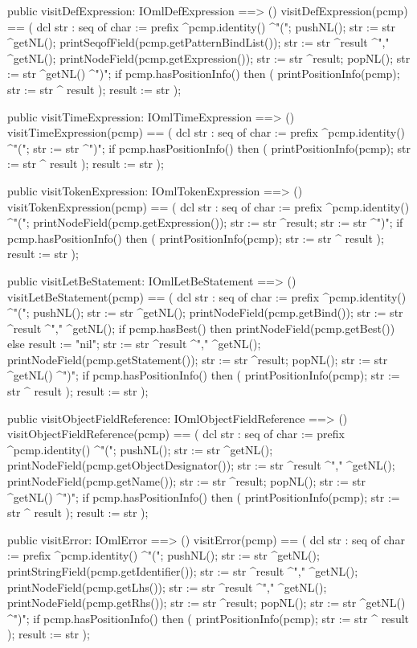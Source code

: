 \begin{vdm_al}
  public visitDefExpression: IOmlDefExpression ==> ()
  visitDefExpression(pcmp) ==
    ( dcl str : seq of char := prefix ^pcmp.identity() ^"(";
      pushNL();
      str := str ^getNL();
      printSeqofField(pcmp.getPatternBindList());
      str := str ^result ^"," ^getNL();
      printNodeField(pcmp.getExpression());
      str := str ^result;
      popNL();
      str := str ^getNL() ^")";
      if pcmp.hasPositionInfo()
      then ( printPositionInfo(pcmp);
             str := str ^ result );
      result := str );

  public visitTimeExpression: IOmlTimeExpression ==> ()
  visitTimeExpression(pcmp) ==
    ( dcl str : seq of char := prefix ^pcmp.identity() ^"(";
      str := str ^")";
      if pcmp.hasPositionInfo()
      then ( printPositionInfo(pcmp);
             str := str ^ result );
      result := str );

  public visitTokenExpression: IOmlTokenExpression ==> ()
  visitTokenExpression(pcmp) ==
    ( dcl str : seq of char := prefix ^pcmp.identity() ^"(";
      printNodeField(pcmp.getExpression());
      str := str ^result;
      str := str ^")";
      if pcmp.hasPositionInfo()
      then ( printPositionInfo(pcmp);
             str := str ^ result );
      result := str );

  public visitLetBeStatement: IOmlLetBeStatement ==> ()
  visitLetBeStatement(pcmp) ==
    ( dcl str : seq of char := prefix ^pcmp.identity() ^"(";
      pushNL();
      str := str ^getNL();
      printNodeField(pcmp.getBind());
      str := str ^result ^"," ^getNL();
      if pcmp.hasBest()
      then printNodeField(pcmp.getBest())
      else result := "nil";
      str := str ^result ^"," ^getNL();
      printNodeField(pcmp.getStatement());
      str := str ^result;
      popNL();
      str := str ^getNL() ^")";
      if pcmp.hasPositionInfo()
      then ( printPositionInfo(pcmp);
             str := str ^ result );
      result := str );

  public visitObjectFieldReference: IOmlObjectFieldReference ==> ()
  visitObjectFieldReference(pcmp) ==
    ( dcl str : seq of char := prefix ^pcmp.identity() ^"(";
      pushNL();
      str := str ^getNL();
      printNodeField(pcmp.getObjectDesignator());
      str := str ^result ^"," ^getNL();
      printNodeField(pcmp.getName());
      str := str ^result;
      popNL();
      str := str ^getNL() ^")";
      if pcmp.hasPositionInfo()
      then ( printPositionInfo(pcmp);
             str := str ^ result );
      result := str );

  public visitError: IOmlError ==> ()
  visitError(pcmp) ==
    ( dcl str : seq of char := prefix ^pcmp.identity() ^"(";
      pushNL();
      str := str ^getNL();
      printStringField(pcmp.getIdentifier());
      str := str ^result ^"," ^getNL();
      printNodeField(pcmp.getLhs());
      str := str ^result ^"," ^getNL();
      printNodeField(pcmp.getRhs());
      str := str ^result;
      popNL();
      str := str ^getNL() ^")";
      if pcmp.hasPositionInfo()
      then ( printPositionInfo(pcmp);
             str := str ^ result );
      result := str );


\end{vdm_al}

